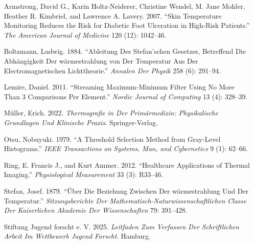 \documentclass[
  11pt,
]{article}
\newlength{\cslhangindent}
\newenvironment{CSLReferences}[2] %
 {\begin{list}{}{%
  \setlength{\itemindent}{0pt}
  \setlength{\leftmargin}{0pt}
  \setlength{\parsep}{0pt}
  \ifodd #1
   \setlength{\leftmargin}{\cslhangindent}
   \setlength{\itemindent}{-1\cslhangindent}
  \fi
  \setlength{\itemsep}{#2\baselineskip}}}
 {\end{list}}
\begin{document}
\protect{}\label{refs}
\begin{CSLReferences}{1}{1}
Armstrong, David G., Karin Holtz-Neiderer, Christine Wendel, M. Jane
Mohler, Heather R. Kimbriel, and Lawrence A. Lavery. 2007. {``Skin
Temperature Monitoring Reduces the Risk for Diabetic Foot Ulceration in
High-Risk Patients.''} \emph{The American Journal of Medicine} 120 (12):
1042--46.

Boltzmann, Ludwig. 1884. {``Ableitung Des Stefan'schen Gesetzes,
Betreffend Die Abh{ä}ngigkeit Der w{ä}rmestrahlung von Der Temperatur
Aus Der Electromagnetischen Lichttheorie.''} \emph{Annalen Der Physik}
258 (6): 291--94.

Lemire, Daniel. 2011. {``Streaming Maximum-Minimum Filter Using No More
Than 3 Comparisons Per Element.''} \emph{Nordic Journal of Computing} 13
(4): 328--39.

Müller, Erich. 2022. \emph{Thermografie in Der Prim{ä}rmedizin:
Physikalische Grundlagen Und Klinische Praxis}. Springer-Verlag.

Otsu, Nobuyuki. 1979. {``A Threshold Selection Method from Gray-Level
Histograms.''} \emph{IEEE Transactions on Systems, Man, and Cybernetics}
9 (1): 62--66.

Ring, E. Francis J., and Kurt Ammer. 2012. {``Healthcare Applications of
Thermal Imaging.''} \emph{Physiological Measurement} 33 (3): R33--46.

Stefan, Josef. 1879. {``{Ü}ber Die Beziehung Zwischen Der
w{ä}rmestrahlung Und Der Temperatur.''} \emph{Sitzungsberichte Der
Mathematisch-Naturwissenschaftlichen Classe Der Kaiserlichen Akademie
Der Wissenschaften} 79: 391--428.

Stiftung Jugend forscht e. V. 2025. \emph{Leitfaden Zum Verfassen Der
Schriftlichen Arbeit Im Wettbewerb Jugend Forscht}. Hamburg.

\end{CSLReferences}
\end{document}
